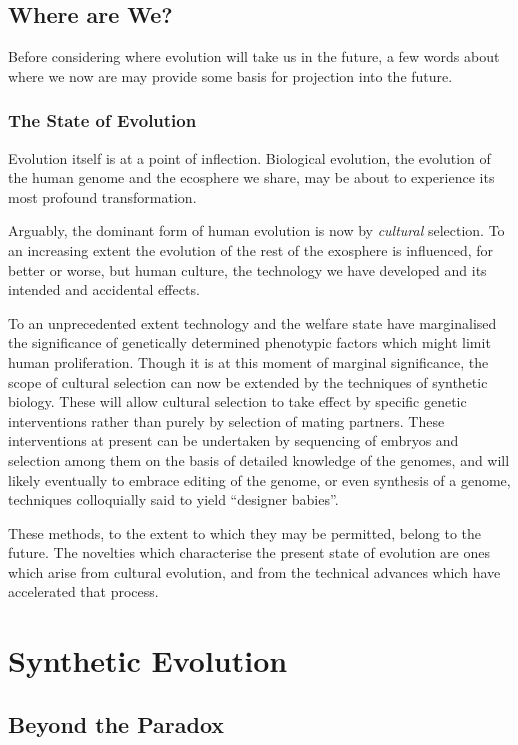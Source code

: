 \documentclass[10pt,titlepage]{book}
\begin{document}
\chapter{Where are We?}

Before considering where evolution will take us in the future, a few words about where we now are may provide some basis for projection into the future.

\section{The State of Evolution}

Evolution itself is at a point of inflection.
Biological evolution, the evolution of the human genome and the ecosphere we share, may be about to experience its most profound transformation.

Arguably, the dominant form of human evolution is now by \emph{cultural} selection.
To an increasing extent the evolution of the rest of the exosphere is influenced, for better or worse, but human culture, the technology we have developed and its intended and accidental effects.

To an unprecedented extent technology and the welfare state have marginalised the significance of genetically determined phenotypic factors which might limit human proliferation.
Though it is at this moment of marginal significance, the scope of cultural selection can now be extended by the techniques of synthetic biology.
These will allow cultural selection to take effect by specific genetic interventions rather than purely by selection of mating partners.
These interventions at present can be undertaken by sequencing of embryos and selection among them on the basis of detailed knowledge of the genomes, and will likely eventually to embrace editing of the genome, or even synthesis of a genome, techniques colloquially said to yield ``designer babies''.

These methods, to the extent to which they may be permitted,  belong to the future.
The novelties which characterise the present state of evolution are ones which arise from cultural evolution, and from the technical advances which have accelerated that process.



\part{Synthetic Evolution}

\chapter{Beyond the Paradox}
\end{document}

